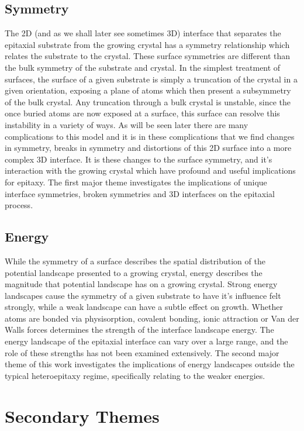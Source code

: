 \subsection{Symmetry} The 2D (and as we shall later see sometimes 3D) interface that separates the epitaxial substrate from the growing crystal has a symmetry relationship which relates the substrate to the crystal.
These surface symmetries are different than the bulk symmetry of the substrate and crystal.
In the simplest treatment of surfaces, the surface of a given substrate is simply a truncation of the crystal in a given orientation, exposing a plane of atoms which then present a subsymmetry of the bulk crystal.
Any truncation through a bulk crystal is unstable, since the once buried atoms are now exposed at a surface, this surface can resolve this instability in a variety of ways.
As will be seen later there are many complications to this model and it is in these complications that we find changes in symmetry, breaks in symmetry and distortions of this 2D surface into a more complex 3D interface.
It is these changes to the surface symmetry, and it's interaction with the growing crystal which have profound and useful implications for epitaxy.
The first major theme investigates the implications of unique interface symmetries, broken symmetries and 3D interfaces on the epitaxial process.

\subsection{Energy} While the symmetry of a surface describes the spatial distribution of the potential landscape presented to a growing crystal, energy describes the magnitude that potential landscape has on a growing crystal.
Strong energy landscapes cause the symmetry of a given substrate to have it's influence felt strongly, while a weak landscape can have a subtle effect on growth.
Whether atoms are bonded via physisorption, covalent bonding, ionic attraction or Van der Walls forces determines the strength of the interface landscape energy.
The energy landscape of the epitaxial interface can vary over a large range, and the role of these strengths has not been examined extensively.
The second major theme of this work investigates the implications of energy landscapes outside the typical heteroepitaxy regime, specifically relating to the weaker energies.

\section{Secondary Themes}
